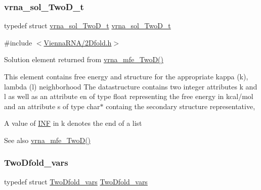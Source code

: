 \subsubsection{\texorpdfstring{vrna\+\_\+sol\+\_\+\+Two\+D\+\_\+t}{vrna\_sol\_TwoD\_t}}
{\footnotesize\ttfamily typedef struct \hyperlink{group__kl__neighborhood__mfe_structvrna__sol__TwoD__t}{vrna\+\_\+sol\+\_\+\+Two\+D\+\_\+t}  \hyperlink{group__kl__neighborhood__mfe_structvrna__sol__TwoD__t}{vrna\+\_\+sol\+\_\+\+Two\+D\+\_\+t}}



{\ttfamily \#include $<$\hyperlink{2Dfold_8h}{Vienna\+R\+N\+A/2\+Dfold.\+h}$>$}



Solution element returned from \hyperlink{group__kl__neighborhood__mfe_ga243c288b463147352829df04de6a2f77}{vrna\+\_\+mfe\+\_\+\+Two\+D()} 

This element contains free energy and structure for the appropriate kappa (k), lambda (l) neighborhood The datastructure contains two integer attributes \textquotesingle{}k\textquotesingle{} and \textquotesingle{}l\textquotesingle{} as well as an attribute \textquotesingle{}en\textquotesingle{} of type float representing the free energy in kcal/mol and an attribute \textquotesingle{}s\textquotesingle{} of type char$\ast$ containg the secondary structure representative,

A value of \hyperlink{energy__const_8h_a12c2040f25d8e3a7b9e1c2024c618cb6}{I\+NF} in k denotes the end of a list

\begin{DoxySeeAlso}{See also}
\hyperlink{group__kl__neighborhood__mfe_ga243c288b463147352829df04de6a2f77}{vrna\+\_\+mfe\+\_\+\+Two\+D()} 
\end{DoxySeeAlso}
\mbox{\label{group__kl__neighborhood__mfe_gaf4f514010a14f9d59d850742b3e96954}} 
\subsubsection{\texorpdfstring{Two\+Dfold\+\_\+vars}{TwoDfold\_vars}}
{\footnotesize\ttfamily typedef struct \hyperlink{group__kl__neighborhood__mfe_structTwoDfold__vars}{Two\+Dfold\+\_\+vars}  \hyperlink{group__kl__neighborhood__mfe_structTwoDfold__vars}{Two\+Dfold\+\_\+vars}}



